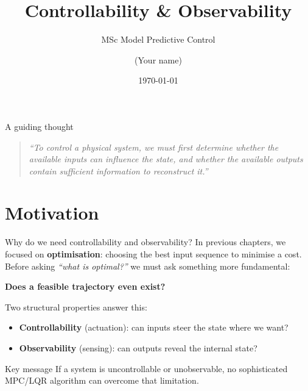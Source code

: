 \documentclass[aspectratio=169,10pt]{beamer}
\title[Controllability \& Observability]{Controllability \& Observability}
\subtitle{MSc Model Predictive Control}
\author{(Your name)}
\institute{(Your institution)}
\date{\today}
\begin{document}
\begin{frame}
\titlepage
\end{frame}

\begin{frame}{A guiding thought}
\begin{quote}
\itshape
``To control a physical system, we must first determine whether the available inputs can influence the state,
and whether the available outputs contain sufficient information to reconstruct it.''
\end{quote}
\end{frame}

\section{Motivation}

\begin{frame}{Why do we need controllability and observability?}
In previous chapters, we focused on \textbf{optimisation}: choosing the best input sequence to minimise a cost.
Before asking \emph{``what is optimal?''} we must ask something more fundamental:

\begin{center}
\textbf{Does a feasible trajectory even exist?}
\end{center}

Two structural properties answer this:
\begin{itemize}
  \item \textbf{Controllability} (actuation): can inputs steer the state where we want?
  \item \textbf{Observability} (sensing): can outputs reveal the internal state?
\end{itemize}

\begin{alertbox}{Key message}
If a system is uncontrollable or unobservable, no sophisticated MPC/LQR algorithm can overcome that limitation.
\end{alertbox}
\end{frame}
\end{document}
